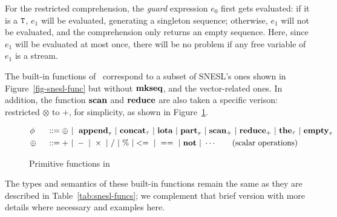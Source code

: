 For the restricted comprehension, the \emph{guard} expression $e_0$ first gets evaluated: if it is a $\mathtt{T}$, $e_1$ will be evaluated, generating a singleton sequence; otherwise, $e_1$ will not be evaluated, and the comprehension only returns an empty sequence. Here, since $e_1$ will be evaluated at most once, there will be no problem if any free variable of $e_1$ is a stream.

The built-in functions of \mysnesl \ correspond to a subset of SNESL's ones shown in Figure~\ref{fig-snesl-func} but without $\mathbf{mkseq}$, and the vector-related ones. 
In addition, the function $\mathbf{scan}$ and $\mathbf{reduce}$ are also
taken a specific verison: restricted $\otimes$ to +, for simplicity, as shown in Figure~\ref{fig-mysnesl-func}. 


\begin{figure}[H]\large
	\begin{alignat*}{2} 
	&\phi && ::= \oplus \ | \  \ \mathbf{append}_{\tau} \ | \ \mathbf{concat}_{\tau}  \ | \ \mathbf{iota}  \ | \ \mathbf{part}_{\tau}  \ | \ \mathbf{scan}_+ \ | \ \mathbf{reduce}_{+} \ | \ \mathbf{the}_{\tau}  \ | \ \mathbf{empty}_{\tau} \\	
	& \oplus  \ && :: = + \ | \ - \ | \ \times \ |  \  / \ | \ \% \ | <= \ | \ == \ | \  \mathbf{not} \ | \ \cdots \tag{scalar operations} 
	\end{alignat*}
	\caption{Primitive functions in \mysnesl \label{fig-mysnesl-func}}
\end{figure}

The types and semantics of these built-in functions remain the same as they are described in Table~\ref{tab:snesl-funcs}; we complement that brief version with more details where necessary and examples here.

